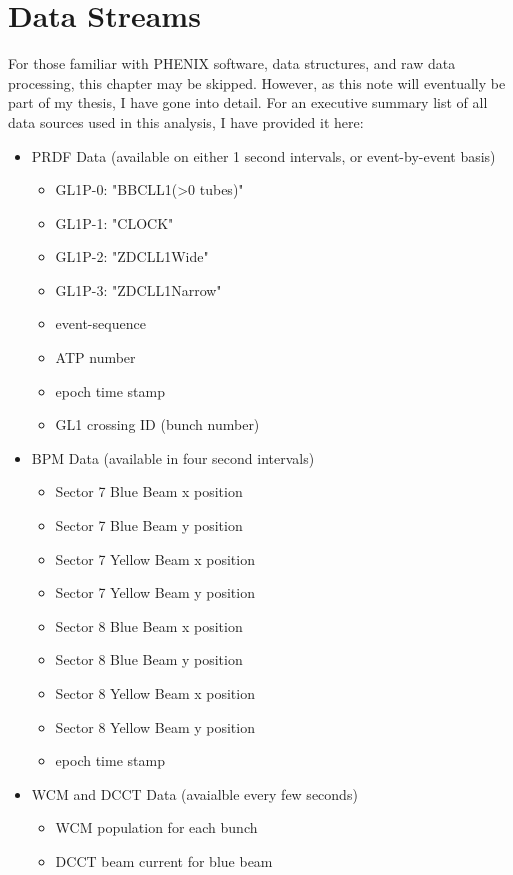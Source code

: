 \chapter{Data Streams}
\label{ch:DataStreams}

For those familiar with PHENIX software, data structures, and raw data
processing, this chapter may be skipped. However, as this note will eventually
be part of my thesis, I have gone into detail. For an executive summary list of
all data sources used in this analysis, I have provided it here:

\begin{itemize}
\item PRDF Data (available on either 1 second intervals, or event-by-event basis)
  \begin{itemize}
  \item GL1P-0: "BBCLL1(\textgreater0 tubes)"
  \item GL1P-1: "CLOCK"
  \item GL1P-2: "ZDCLL1Wide"
  \item GL1P-3: "ZDCLL1Narrow"
  \item event-sequence
  \item ATP number
  \item epoch time stamp
  \item GL1 crossing ID (bunch number)
  \end{itemize}
\item BPM Data (available in four second intervals)
  \begin{itemize}
  \item Sector 7 Blue Beam x position
  \item Sector 7 Blue Beam y position
  \item Sector 7 Yellow Beam x position
  \item Sector 7 Yellow Beam y position
  \item Sector 8 Blue Beam x position
  \item Sector 8 Blue Beam y position
  \item Sector 8 Yellow Beam x position
  \item Sector 8 Yellow Beam y position
  \item epoch time stamp
  \end{itemize}
\item WCM and DCCT Data (avaialble every few seconds)
  \begin{itemize}
  \item WCM population for each bunch
  \item DCCT beam current for blue beam

\end{itemize}
\end{itemize}
